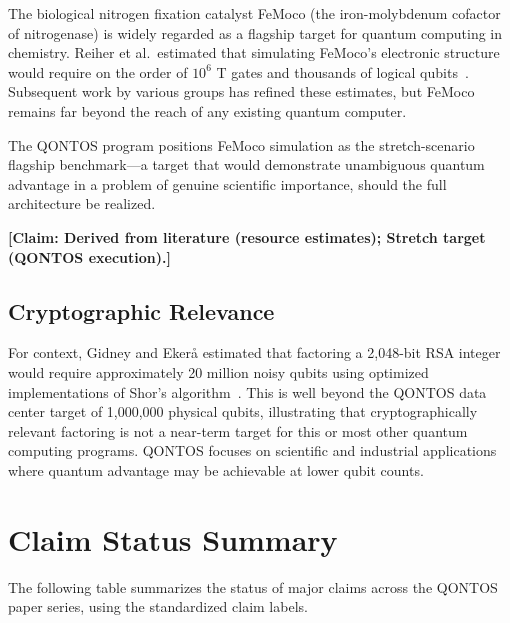 \documentclass[conference]{IEEEtran}
\begin{document}
The biological nitrogen fixation catalyst FeMoco (the iron-molybdenum cofactor of nitrogenase) is widely regarded as a flagship target for quantum computing in chemistry. Reiher et al.\ estimated that simulating FeMoco's electronic structure would require on the order of $10^6$ T gates and thousands of logical qubits~\cite{reiher2017}. Subsequent work by various groups has refined these estimates, but FeMoco remains far beyond the reach of any existing quantum computer.

The QONTOS program positions FeMoco simulation as the stretch-scenario flagship benchmark---a target that would demonstrate unambiguous quantum advantage in a problem of genuine scientific importance, should the full architecture be realized.

\textbf{[Claim: Derived from literature (resource estimates); Stretch target (QONTOS execution).]}

\subsection{Cryptographic Relevance}

For context, Gidney and Eker\aa{} estimated that factoring a 2,048-bit RSA integer would require approximately 20 million noisy qubits using optimized implementations of Shor's algorithm~\cite{shor1994, gidney2021}. This is well beyond the QONTOS data center target of 1,000,000 physical qubits, illustrating that cryptographically relevant factoring is not a near-term target for this or most other quantum computing programs. QONTOS focuses on scientific and industrial applications where quantum advantage may be achievable at lower qubit counts.

\section{Claim Status Summary}

The following table summarizes the status of major claims across the QONTOS paper series, using the standardized claim labels.
\end{document}

